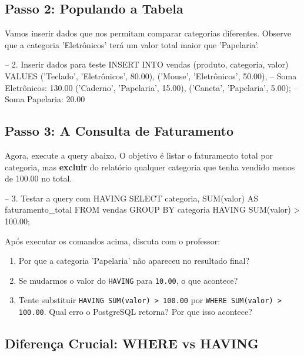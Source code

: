 \subsection{Passo 2: Populando a Tabela}

Vamos inserir dados que nos permitam comparar categorias diferentes. Observe que a categoria 'Eletrônicos' terá um valor total maior que 'Papelaria'.

\begin{sqlcode}
-- 2. Inserir dados para teste
INSERT INTO vendas (produto, categoria, valor) VALUES
('Teclado', 'Eletrônicos', 80.00),
('Mouse',   'Eletrônicos', 50.00),  -- Soma Eletrônicos: 130.00
('Caderno', 'Papelaria',   15.00),
('Caneta',  'Papelaria',    5.00);  -- Soma Papelaria: 20.00
\end{sqlcode}

\subsection{Passo 3: A Consulta de Faturamento}



Agora, execute a query abaixo. O objetivo é listar o faturamento total por categoria, mas \textbf{excluir} do relatório qualquer categoria que tenha vendido menos de 100.00 no total.

\begin{sqlcode}
-- 3. Testar a query com HAVING
SELECT categoria, SUM(valor) AS faturamento_total
FROM vendas
GROUP BY categoria
HAVING SUM(valor) > 100.00;
\end{sqlcode}

\begin{tcolorbox}[colback=orange!5,colframe=orange!75!black,title=Questionário de Reflexão]
Após executar os comandos acima, discuta com o professor:
\begin{enumerate}
    \item Por que a categoria 'Papelaria' não apareceu no resultado final?
    \item Se mudarmos o valor do \texttt{HAVING} para \texttt{10.00}, o que acontece?
    \item Tente substituir \texttt{HAVING SUM(valor) > 100.00} por \texttt{WHERE SUM(valor) > 100.00}. Qual erro o PostgreSQL retorna? Por que isso acontece?
\end{enumerate}
\end{tcolorbox}

\subsection{Diferença Crucial: WHERE vs HAVING}

